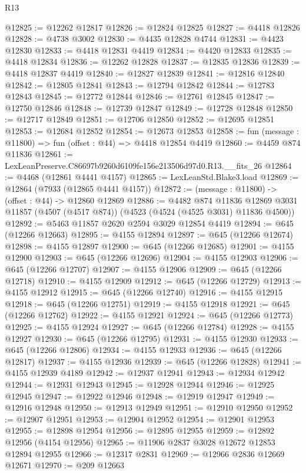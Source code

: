 \begin{lexlean}{R13}
\begin{coremodule}
@12825 := @12262 @12817
@12826 := @12824 @12825
@12827 := @4418 @12826
@12828 := @4738 @3002
@12830 := @4435 @12828 @4744
@12831 := @4423 @12830
@12833 := @4418 @12831 @4419
@12834 := @4420 @12833
@12835 := @4418 @12834
@12836 := @12262 @12828
@12837 := @12835 @12836
@12839 := @4418 @12837 @4419
@12840 := @12827 @12839
@12841 := @12816 @12840
@12842 := @12805 @12841
@12843 := @12794 @12842
@12844 := @12783 @12843
@12845 := @12772 @12844
@12846 := @12761 @12845
@12847 := @12750 @12846
@12848 := @12739 @12847
@12849 := @12728 @12848
@12850 := @12717 @12849
@12851 := @12706 @12850
@12852 := @12695 @12851
@12853 := @12684 @12852
@12854 := @12673 @12853
@12858 := fun (message : @11800) => fun (offset : @44) => @4418 @12854 @4419
@12860 := @4459 @874 @11836
@12861 := LexLeanPreserve.C86697b9260d6109fe156e213506d97d0.R13.__fits_26
@12864 := @4468 (@12861 @4441 @4157)
@12865 := LexLeanStd.Blake3.load
@12869 := @12864 (@7933 (@12865 @4441 @4157))
@12872 := (message : @11800) -> (offset : @44) -> @12860 @12869
@12886 := @4482
    @874
    @11836
    @12869
    @3031
    @11857
    (@4507 (@4517 @874))
    (@4523 (@4524 (@4525 @3031) @11836 @4500))
@12892 := @5463 @11857 @2620 @2594 @3029 @12854 @4419
@12894 := @645 (@12266 @12663)
@12895 := @4155 @12894
@12897 := @645 (@12266 @12674)
@12898 := @4155 @12897
@12900 := @645 (@12266 @12685)
@12901 := @4155 @12900
@12903 := @645 (@12266 @12696)
@12904 := @4155 @12903
@12906 := @645 (@12266 @12707)
@12907 := @4155 @12906
@12909 := @645 (@12266 @12718)
@12910 := @4155 @12909
@12912 := @645 (@12266 @12729)
@12913 := @4155 @12912
@12915 := @645 (@12266 @12740)
@12916 := @4155 @12915
@12918 := @645 (@12266 @12751)
@12919 := @4155 @12918
@12921 := @645 (@12266 @12762)
@12922 := @4155 @12921
@12924 := @645 (@12266 @12773)
@12925 := @4155 @12924
@12927 := @645 (@12266 @12784)
@12928 := @4155 @12927
@12930 := @645 (@12266 @12795)
@12931 := @4155 @12930
@12933 := @645 (@12266 @12806)
@12934 := @4155 @12933
@12936 := @645 (@12266 @12817)
@12937 := @4155 @12936
@12939 := @645 (@12266 @12828)
@12941 := @4155 @12939 @4189
@12942 := @12937 @12941
@12943 := @12934 @12942
@12944 := @12931 @12943
@12945 := @12928 @12944
@12946 := @12925 @12945
@12947 := @12922 @12946
@12948 := @12919 @12947
@12949 := @12916 @12948
@12950 := @12913 @12949
@12951 := @12910 @12950
@12952 := @12907 @12951
@12953 := @12904 @12952
@12954 := @12901 @12953
@12955 := @12898 @12954
@12956 := @12895 @12955
@12959 := @12892 @12956 (@4154 @12956)
@12965 := @11906 @2837 @3028 @12672 @12853 @12894 @12955
@12966 := @12317 @2831
@12969 := @12966 @2836 @12669 @12671
@12970 := @209 @12663

\end{coremodule}
\end{lexlean}
